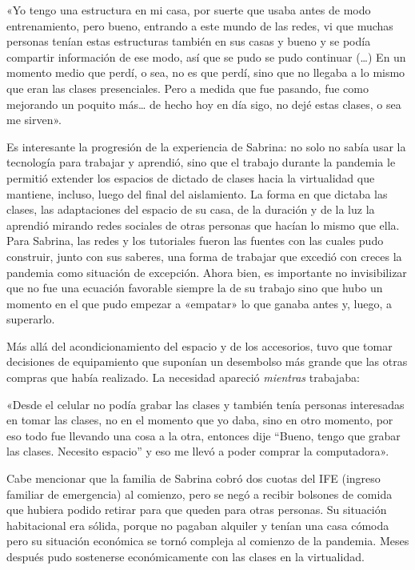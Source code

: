 \begin{refsection}
\begin{gbcita}
«Yo tengo una estructura en mi casa, por suerte que usaba antes de modo entrenamiento, pero bueno, entrando a este mundo de las redes, vi que muchas personas tenían estas estructuras también en sus casas y bueno y se podía compartir información de ese modo, así que se pudo se pudo continuar (…) En un momento medio que perdí, o sea, no es que perdí, sino que no llegaba a lo mismo que eran las clases presenciales. Pero a medida que fue pasando, fue como mejorando un poquito más… de hecho hoy en día sigo, no dejé estas clases, o sea me sirven».

\end{gbcita}

Es interesante la progresión de la experiencia de Sabrina: no solo no sabía usar la tecnología para trabajar y aprendió, sino que el trabajo durante la pandemia le permitió extender los espacios de dictado de clases hacia la virtualidad que mantiene, incluso, luego del final del aislamiento. La forma en que dictaba las clases, las adaptaciones del espacio de su casa, de la duración y de la luz la aprendió mirando redes sociales de otras personas que hacían lo mismo que ella. Para Sabrina, las redes y los tutoriales fueron las fuentes con las cuales pudo construir, junto con sus saberes, una forma de trabajar que excedió con creces la pandemia como situación de excepción. Ahora bien, es importante no invisibilizar que no fue una ecuación favorable siempre la de su trabajo sino que hubo un momento en el que pudo empezar a «empatar» lo que ganaba antes y, luego, a superarlo.

Más allá del acondicionamiento del espacio y de los accesorios, tuvo que tomar decisiones de equipamiento que suponían un desembolso más grande que las otras compras que había realizado. La necesidad apareció \emph{mientras} trabajaba:


\begin{gbcita}
«Desde el celular no podía grabar las clases y también tenía personas interesadas en tomar las clases, no en el momento que yo daba, sino en otro momento, por eso todo fue llevando una cosa a la otra, entonces dije “Bueno, tengo que grabar las clases. Necesito espacio” y eso me llevó a poder comprar la computadora».

\end{gbcita}

Cabe mencionar que la familia de Sabrina cobró dos cuotas del IFE (ingreso familiar de emergencia) al comienzo, pero se negó a recibir bolsones de comida que hubiera podido retirar para que queden para otras personas. Su situación habitacional era sólida, porque no pagaban alquiler y tenían una casa cómoda pero su situación económica se tornó compleja al comienzo de la pandemia. Meses después pudo sostenerse económicamente con las clases en la virtualidad.


\end{refsection}
